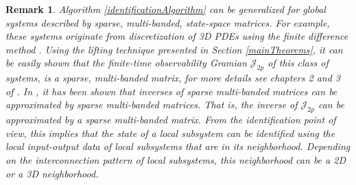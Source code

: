 \documentclass[journal,10pt]{IEEEtran}
\newtheorem{rem}[thm]{Remark}
\begin{document}
\begin{rem}
Algorithm \ref{identificationAlgorithm} can be generalized for global systems described by sparse, multi-banded, state-space matrices. For example, these systems originate from discretization of 3D PDEs using the finite difference method \cite{haberThesis}. Using the lifting technique presented in Section  \ref{mainTheorems}, it can be easily shown that the finite-time observability Gramian  $\mathcal{J}_{2p}$ of this class of systems, is a sparse, multi-banded matrix, for more details see chapters 2 and 3 of \cite{haberThesis}. In \cite{grote1997,benzi2007,haberThesis}, it has been shown that inverses  of sparse multi-banded matrices can be approximated by sparse multi-banded matrices. That is, the inverse of $\mathcal{J}_{2p}$ can be approximated by a sparse multi-banded matrix. From the identification point of view, this implies that the state of a local subsystem can be identified using the local input-output data of local subsystems that are in its neighborhood. Depending on the interconnection pattern of local subsystems, this neighborhood can be a 2D or a 3D neighborhood. 
\label{remarkGeneralization}
\end{rem}
\end{document}
